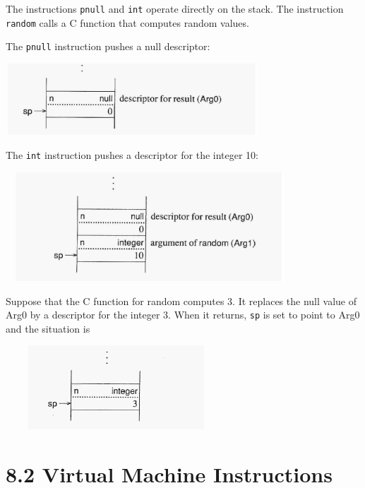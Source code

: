 The instructions \texttt{pnull} and \texttt{int} operate directly on
the stack. The instruction \texttt{random} calls a C function that
computes random values.

The \texttt{pnull} instruction pushes a null descriptor:

\begin{center}
\includegraphics[width=3.7402in,height=1.0575in]{ib-img/ib-img042.jpg}
\end{center}

\bigskip


\bigskip


\bigskip


\bigskip

\clearpage
The \texttt{int} instruction pushes a descriptor for the integer 10:


\ \  \includegraphics[width=3.9543in,height=1.6063in]{ib-img/ib-img043.jpg} 

Suppose that the C function for random computes 3. It replaces the
null value of Arg0 by a descriptor for the integer 3.  When it
returns, \texttt{sp} is set to point to Arg0 and the situation is


\ \ \ \  \includegraphics[width=2.6717in,height=1.239in]{ib-img/ib-img044.jpg} 


\section[8.2 Virtual Machine Instructions]{8.2 Virtual Machine Instructions}

